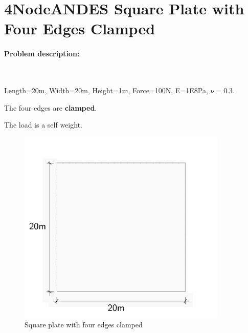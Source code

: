 \section{4NodeANDES Square Plate with Four Edges Clamped}



\paragraph{Problem description:} ~



Length=20m, Width=20m, Height=1m, Force=100N, E=1E8Pa, $\nu=0.3$. 

The four edges are \textbf{clamped}. 

The load is a self weight.


\begin{figure}[!htb]
  \centering
  \includegraphics[width=10cm]{./Figure-files/_Chapter_Appendix_Illustrative_Examples/square_plate_descrp.pdf}
  \caption{Square plate with four edges clamped }
  \label{fig 4NodeANDES edges clamped square plate with element side length for program description }
\end{figure}


